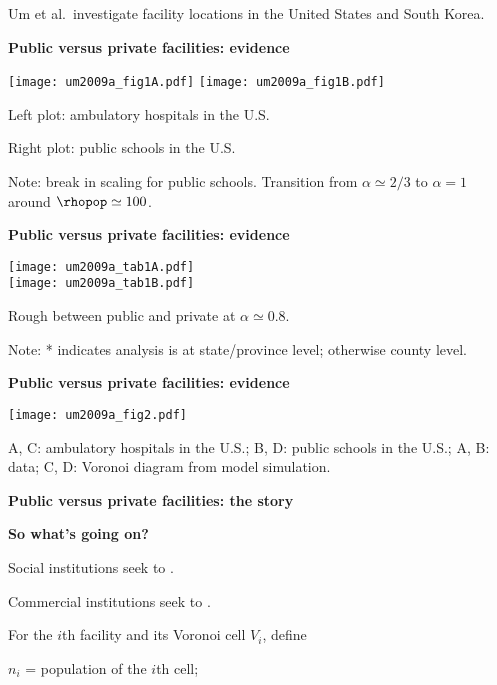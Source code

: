     
      Um et al.\ investigate facility locations in the United States
      and South Korea.
    
  
  


  \textbf{Public versus private facilities: evidence}

  \texttt{[image: um2009a\_fig1A.pdf]}
  \texttt{[image: um2009a\_fig1B.pdf]}

  
  
    \alert{Left plot:} ambulatory hospitals in the U.S.
   
    \alert{Right plot:} public schools in the U.S.
  
    Note: break in scaling for public schools.
    Transition from $\alpha \simeq 2/3$ to 
    $\alpha = 1$ around $\rhopop \simeq 100$.
  


  \textbf{Public versus private facilities: evidence}

      
    \texttt{[image: um2009a\_tab1A.pdf]}\\
    \texttt{[image: um2009a\_tab1B.pdf]}
    
      {\small
        Rough  between public and private at $\alpha \simeq 0.8$.

        \medskip

        Note: * indicates analysis is at state/province level; otherwise county level.}
  

  \textbf{Public versus private facilities: evidence}

  \texttt{[image: um2009a\_fig2.pdf]}

  \alert{A, C:} ambulatory hospitals in the U.S.;
  \alert{B, D:} public schools in the U.S.;
  \alert{A, B:} data; 
  \alert{C, D:} Voronoi diagram from model simulation.


  \textbf{Public versus private facilities: the story}

  \textbf{So what's going on?}
    
    
      Social institutions seek to .
    
      Commercial institutions seek to .
    
       For the $i$th facility and its Voronoi cell $V_i$, define
      
      
        $n_i$ = population of the $i$th cell;
      
